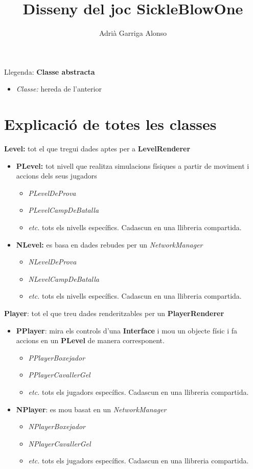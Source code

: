 \documentclass[12pt,a4paper,oneside]{article}
\begin{document}
\title{Disseny del joc SickleBlowOne}
\author{Adrià Garriga Alonso}
\maketitle
Llegenda: \textbf{Classe abstracta}
\begin{itemize}
\item \textit{Classe:} hereda de l'anterior
\end{itemize}

\section{Explicació de totes les classes}
\textbf{Level:} tot el que tregui dades aptes per a \textbf{LevelRenderer}
\begin{itemize}
\item \textbf{PLevel:} tot nivell que realitza simulacions físiques a partir de moviment i accions dels seus jugadors
\begin{itemize}
\item \textit{PLevelDeProva}
\item \textit{PLevelCampDeBatalla}
\item \textit{etc.} tots els nivells específics. Cadascun en una llibreria compartida.
\end{itemize}
\item \textbf{NLevel:} es basa en dades rebudes per un \textit{NetworkManager}
\begin{itemize}
\item \textit{NLevelDeProva}
\item\textit{NLevelCampDeBatalla}
\item\textit{etc.} tots els nivells específics. Cadascun en una llibreria compartida.
\end{itemize}
\end{itemize}

\textbf{Player}: tot el que treu dades renderitzables per un \textbf{PlayerRenderer}
\begin{itemize}
\item\textbf{PPlayer}: mira els controls d'una \textbf{Interface} i mou un objecte físic i fa accions en un \textbf{PLevel} de manera corresponent.
\begin{itemize}
\item \textit{PPlayerBoxejador}
\item\textit{PPlayerCavallerGel}
\item\textit{etc.} tots els jugadors específics. Cadascun en una llibreria compartida.
\end{itemize}
\item\textbf{NPlayer}: es mou basat en un \textit{NetworkManager}
\begin{itemize}
\item \textit{NPlayerBoxejador}
\item\textit{NPlayerCavallerGel}
\item\textit{etc.} tots els jugadors específics. Cadascun en una llibreria compartida.
\end{itemize}
\end{itemize}
\end{document}
